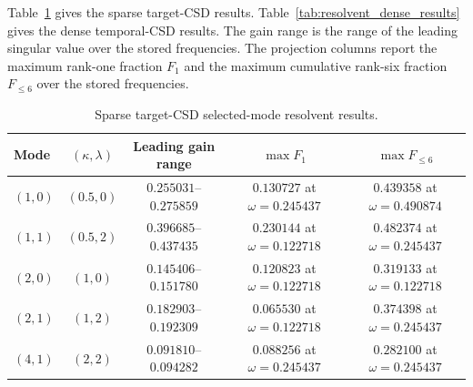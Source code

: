\documentclass[11pt]{article}
\begin{document}
Table~\ref{tab:resolvent_sparse_results} gives the sparse target-CSD results.
Table~\ref{tab:resolvent_dense_results} gives the dense temporal-CSD results.
The gain range is the range of the leading singular value over the stored
frequencies. The projection columns report the maximum rank-one fraction
\(F_1\) and the maximum cumulative rank-six fraction \(F_{\le6}\) over the
stored frequencies.

\begin{table}[H]
  \centering
  \caption{Sparse target-CSD selected-mode resolvent results.}
  \label{tab:resolvent_sparse_results}
  \small
  \begin{tabular}{lcccc}
    \toprule
    Mode & \((\kappa,\lambda)\) & Leading gain range
      & \(\max F_1\) & \(\max F_{\le6}\) \\
    \midrule
    \((1,0)\) & \((0.5,0)\) & \(0.255031\)--\(0.275859\)
      & \(0.130727\) at \(\omega=0.245437\)
      & \(0.439358\) at \(\omega=0.490874\) \\
    \((1,1)\) & \((0.5,2)\) & \(0.396685\)--\(0.437435\)
      & \(0.230144\) at \(\omega=0.122718\)
      & \(0.482374\) at \(\omega=0.245437\) \\
    \((2,0)\) & \((1,0)\) & \(0.145406\)--\(0.151780\)
      & \(0.120823\) at \(\omega=0.122718\)
      & \(0.319133\) at \(\omega=0.122718\) \\
    \((2,1)\) & \((1,2)\) & \(0.182903\)--\(0.192309\)
      & \(0.065530\) at \(\omega=0.122718\)
      & \(0.374398\) at \(\omega=0.245437\) \\
    \((4,1)\) & \((2,2)\) & \(0.091810\)--\(0.094282\)
      & \(0.088256\) at \(\omega=0.245437\)
      & \(0.282100\) at \(\omega=0.245437\) \\
    \bottomrule
  \end{tabular}
\end{table}
\end{document}
